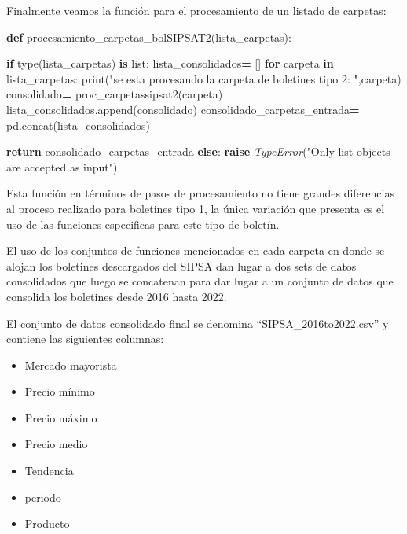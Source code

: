 \documentclass[
]{book}
\newenvironment{Shaded}{\begin{snugshade}}{\end{snugshade}}
\newcommand{\BuiltInTok}[1]{#1}
\newcommand{\ControlFlowTok}[1]{\textcolor[rgb]{0.13,0.29,0.53}{\textbf{#1}}}
\newcommand{\KeywordTok}[1]{\textcolor[rgb]{0.13,0.29,0.53}{\textbf{#1}}}
\newcommand{\NormalTok}[1]{#1}
\newcommand{\OperatorTok}[1]{\textcolor[rgb]{0.81,0.36,0.00}{\textbf{#1}}}
\newcommand{\PreprocessorTok}[1]{\textcolor[rgb]{0.56,0.35,0.01}{\textit{#1}}}
\newcommand{\StringTok}[1]{\textcolor[rgb]{0.31,0.60,0.02}{#1}}
\providecommand{\tightlist}{%
  \setlength{\itemsep}{0pt}\setlength{\parskip}{0pt}}
\begin{document}
Finalmente veamos la función para el procesamiento de un listado de carpetas:

\begin{Shaded}
\begin{Highlighting}[]

\KeywordTok{def}\NormalTok{ procesamiento\_carpetas\_bolSIPSAT2(lista\_carpetas):}
    
    \ControlFlowTok{if} \BuiltInTok{type}\NormalTok{(lista\_carpetas) }\KeywordTok{is} \BuiltInTok{list}\NormalTok{:}
\NormalTok{        lista\_consolidados}\OperatorTok{=}\NormalTok{ []}
        \ControlFlowTok{for}\NormalTok{ carpeta }\KeywordTok{in}\NormalTok{ lista\_carpetas:}
            \BuiltInTok{print}\NormalTok{(}\StringTok{"se esta procesando la carpeta de boletines tipo 2: "}\NormalTok{,carpeta)}
\NormalTok{            consolidado}\OperatorTok{=}\NormalTok{ proc\_carpetassipsat2(carpeta)}
\NormalTok{            lista\_consolidados.append(consolidado)}
\NormalTok{            consolidado\_carpetas\_entrada}\OperatorTok{=}\NormalTok{ pd.concat(lista\_consolidados)}
        
        \ControlFlowTok{return}\NormalTok{ consolidado\_carpetas\_entrada}
    \ControlFlowTok{else}\NormalTok{:}
        \ControlFlowTok{raise} \PreprocessorTok{TypeError}\NormalTok{(}\StringTok{"Only list objects are accepted as input"}\NormalTok{)}
 
\end{Highlighting}
\end{Shaded}

Esta función en términos de pasos de procesamiento no tiene grandes diferencias al proceso realizado para boletines tipo 1, la única variación que presenta es el uso de las funciones especificas para este tipo de boletín.

El uso de los conjuntos de funciones mencionados en cada carpeta en donde se alojan los boletines descargados del SIPSA dan lugar a dos sets de datos consolidados que luego se concatenan para dar lugar a un conjunto de datos que consolida los boletines desde 2016 hasta 2022.

El conjunto de datos consolidado final se denomina ``SIPSA\_2016to2022.csv'' y contiene las siguientes columnas:

\begin{itemize}
\tightlist
\item
  Mercado mayorista
\item
  Precio mínimo
\item
  Precio máximo
\item
  Precio medio
\item
  Tendencia
\item
  periodo
\item
  Producto
\end{itemize}
\end{document}
